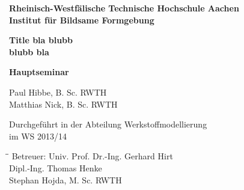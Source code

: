 %


\thispagestyle{empty} %

\begin{titlepage}     %

	\sffamily
	\begin{center}
		\vspace{1cm}
		
		\large{\textbf{Rheinisch-Westfälische Technische Hochschule Aachen\\Institut für Bildsame Formgebung}}
		
		\vspace{20mm}
				
		\Large{\textbf{Title bla blubb \\}}
		\Large{\textbf{blubb bla}}
		
		\vspace{2cm}
		

		
		\LARGE{\textbf{Hauptseminar}} \\
		
		\vspace{1.5cm}
		
		\large{Paul Hibbe, B. Sc. RWTH\\ Matthias Nick, B. Sc. RWTH}\\
		
		\vspace{3cm}
		\end{center}
		

	
\begin{center}
\large{Durchgeführt in der Abteilung Werkstoffmodellierung \\ im WS 2013/14}
\end{center}

\vspace{3cm}
\begin{tabbing}
\hspace*{3cm}\=\hspace{2cm}\=\kill
Betreuer: \>Univ. Prof. Dr.-Ing. Gerhard Hirt\\
          \>Dipl.-Ing. Thomas Henke\\
          \>Stephan Hojda, M. Sc. RWTH
\end{tabbing}
\end{titlepage} %
